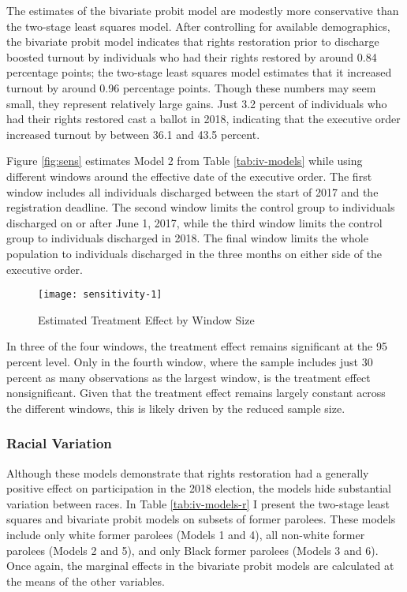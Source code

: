 \documentclass[
  12pt,
]{article}
\begin{document}
The estimates of the bivariate probit model are modestly more conservative than the two-stage least squares model. After controlling for available demographics, the bivariate probit model indicates that rights restoration prior to discharge boosted turnout by individuals who had their rights restored by around 0.84 percentage points; the two-stage least squares model estimates that it increased turnout by around 0.96 percentage points. Though these numbers may seem small, they represent relatively large gains. Just 3.2 percent of individuals who had their rights restored cast a ballot in 2018, indicating that the executive order increased turnout by between 36.1 and 43.5 percent.

Figure \ref{fig:sens} estimates Model 2 from Table \ref{tab:iv-models} while using different windows around the effective date of the executive order. The first window includes all individuals discharged between the start of 2017 and the registration deadline. The second window limits the control group to individuals discharged on or after June 1, 2017, while the third window limits the control group to individuals discharged in 2018. The final window limits the whole population to individuals discharged in the three months on either side of the executive order.

\begin{figure}[H]

{\centering \texttt{[image: sensitivity-1]} 

}

\caption{\label{fig:sens}Estimated Treatment Effect by Window Size}\label{fig:sensitivity}
\end{figure}

In three of the four windows, the treatment effect remains significant at the 95 percent level. Only in the fourth window, where the sample includes just 30 percent as many observations as the largest window, is the treatment effect nonsignificant. Given that the treatment effect remains largely constant across the different windows, this is likely driven by the reduced sample size.

\hypertarget{racial-variation}{%
\subsubsection*{Racial Variation}\label{racial-variation}}

Although these models demonstrate that rights restoration had a generally positive effect on participation in the 2018 election, the models hide substantial variation between races. In Table \ref{tab:iv-models-r} I present the two-stage least squares and bivariate probit models on subsets of former parolees. These models include only white former parolees (Models 1 and 4), all non-white former parolees (Models 2 and 5), and only Black former parolees (Models 3 and 6). Once again, the marginal effects in the bivariate probit models are calculated at the means of the other variables.
\end{document}
